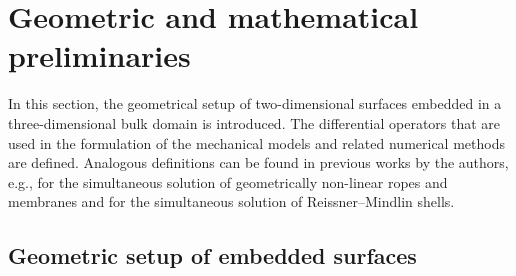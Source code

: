 \documentclass[12pt, twoside, english]{article}
\numberwithin{equation}{section}
\newcommand{\vek}[1]{\mathchoice{\displaystyle\boldsymbol#1}
{\textstyle\boldsymbol#1}{\scriptstyle\boldsymbol#1}
{\scriptscriptstyle\boldsymbol#1}}
\begin{document}
\section{Geometric and mathematical preliminaries}\label{sec:DSandDiffOp}

In this section, the geometrical setup of two-dimensional surfaces embedded in a three-dimensional bulk domain is introduced. The differential operators that are used in the formulation of the mechanical models and related numerical methods are defined. Analogous definitions can be found in previous works by the authors, e.g., \cite{Fries_2023a} for the simultaneous solution of geometrically non-linear ropes and membranes and \cite{Kaiser_2024a} for the simultaneous solution of Reissner--Mindlin shells. 

\subsection{Geometric setup of embedded surfaces}\label{subsec:GeomSetup}

%	
%	
\end{document}

